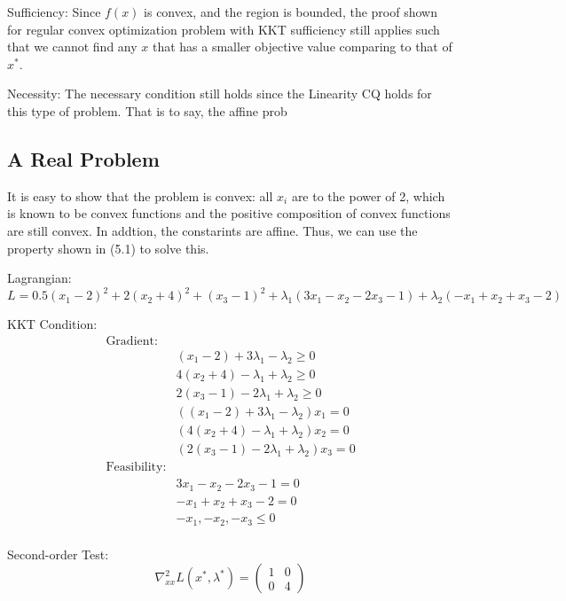 Sufficiency: Since $f(x)$ is convex, and the region is bounded, the proof shown for regular convex optimization problem with KKT sufficiency still applies such that we cannot find any $x$ that has a smaller objective value comparing to that of $x^*$.

Necessity: The necessary condition still holds since the Linearity CQ holds for this type of problem. That is to say, the affine prob


\subsection{A Real Problem}

It is easy to show that the problem is convex: all $x_i$ are to the power of 2, which is known to be convex functions and the positive composition of convex functions are still convex. In addtion, the constarints are affine. Thus, we can use the property shown in (5.1) to solve this.
\par Lagrangian:
\[
L = 0.5(x_1 - 2)^2 + 2(x_2 + 4)^2 + (x_3 - 1)^2 + \lambda_1(3x_1 - x_2 -2x_3 - 1) + \lambda_2 (-x_1 + x_2 +x_3 - 2)
\]
\par KKT Condition:
\begin{align*}
\text{Gradient:}&\\
&(x_1 -2) +  3\lambda_1  - \lambda_2 \geq 0 \\
& 4 (x_2 + 4) - \lambda_1 + \lambda_2 \geq 0 \\
& 2(x_3 - 1) -2\lambda_1 + \lambda_2 \geq 0 \\
& ((x_1 -2) +  3\lambda_1  - \lambda_2) x_1 = 0 \\
& (4 (x_2 + 4) - \lambda_1 + \lambda_2)x_2 = 0 \\
& (2(x_3 - 1) -2\lambda_1 + \lambda_2) x_3 = 0 \\
\text{Feasibility:}&\\
& 3x_1 - x_2 -2x_3 - 1 = 0\\
& -x_1 + x_2 +x_3 - 2 = 0 \\
& -x_1, -x_2, -x_3 \leq 0\\
\end{align*}
\par Second-order Test:
\[
\nabla^2_{xx}L(x^*, \lambda^*) = \left(\begin{array}{cc}
1 & 0\\
0 & 4
\end{array}\right)
\]

